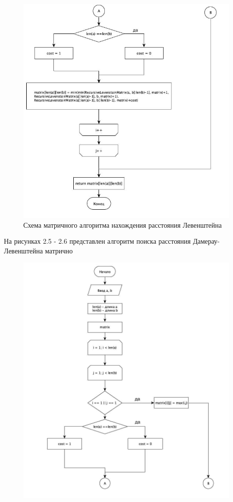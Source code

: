 \documentclass[12pt]{report}
\begin{document}
\begin{figure}[H]
    \centering
    \includegraphics[width=1\linewidth]{3_2.jpg}
    \caption{Схема матричного алгоритма нахождения расстояния Левенштейна}
    \label{fig:mpr}
\end{figure}
На рисунках 2.5 - 2.6 представлен алгоритм поиска расстояния Дамерау-Левенштейна матрично
\begin{figure}[H]
    \centering
    \caption{}
    \includegraphics[width=0.80\linewidth]{4_1.jpg}
    \label{fig:mpr}
\end{figure}
\end{document}
